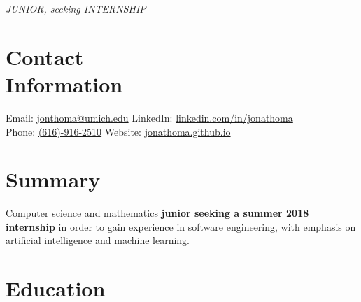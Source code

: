 \documentclass[margin,line]{resume}
\begin{document}
 {\hfill\textsl{\large JUNIOR, seeking INTERNSHIP}}
      
\begin{resume}
    \vspace{-3.5mm}
    \section{\mysidestyle Contact\\Information}
    \noindent Email: \url{jonthoma@umich.edu} \hfill LinkedIn: \url{linkedin.com/in/jonathoma} \\
    \noindent Phone: \url{(616)-916-2510} \hfill Website: \url{jonathoma.github.io} \\ 
    \vspace{-2.5mm}
    
\sectionbreak
\vspace{-3.5mm}
    \section{\mysidestyle Summary}
    Computer science and mathematics \textbf{junior seeking a summer 2018 internship} in order to gain experience in software engineering, with emphasis on artificial intelligence and machine learning. \vspace{-2.5mm}\\ 
    
   \sectionbreak
   \vspace{-2.5mm}
    \section{\mysidestyle Education}


\end{resume}
\end{document}

